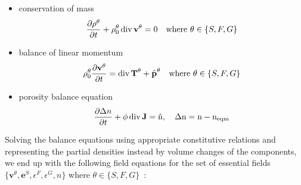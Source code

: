\documentclass[twocolumn]{article}
\begin{document}
\begin{itemize}
    \item conservation of mass
          \begin{equation}
              \frac{\partial{\rho^\theta}}{\partial{t}} +
              \rho_0^\theta\,\rm{div}\,{\textbf{v}^\theta} = 0 \quad\text{where $\theta \in \{S, F, G\}$}
          \end{equation}
    \item balance of linear momentum
          \begin{equation}
              \rho_0^\theta\frac{\partial{\textbf{v}^\theta}}{\partial{t}} = \rm{div}\,\textbf{T}^\theta + \hat{\textbf{p}}^\theta \quad\text{where $\theta \in \{S, F, G\}$}
          \end{equation}
    \item porosity balance equation
          \begin{equation}
              \frac{\partial \Delta{n}}{\partial t} + \phi\,\rm{div}\,\textbf{J} = \hat{n},
              \quad \Delta{n} = n - n_{eqm}
          \end{equation}
\end{itemize}

Solving the balance equations using appropriate constitutive relations and representing the partial densities instead by volume changes of the components, we end up with the following field equations for the set of essential fields $\{\textbf{v}^\theta, \textbf{e}^S, \epsilon^F, \epsilon^G, n\}$ where $\theta \in \{S, F, G\}$~\cite{detmann_num_sim_2008}:
\end{document}
